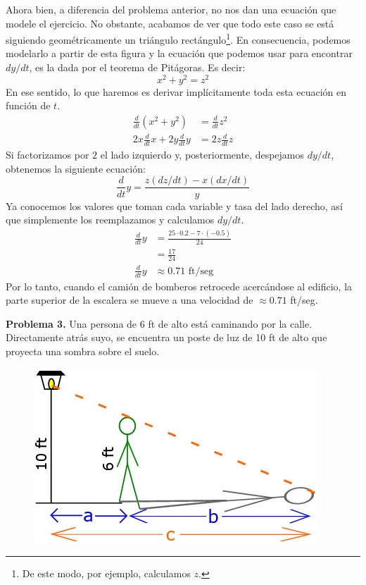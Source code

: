 \documentclass[12pt]{article}
\begin{document}
Ahora bien, a diferencia del problema anterior, no nos dan una ecuación que modele el ejercicio. No obstante, acabamos de ver que todo este caso se está siguiendo geométricamente un triángulo rectángulo\footnote{De este modo, por ejemplo, calculamos $z$.}. En consecuencia, podemos modelarlo a partir de esta figura y la ecuación que podemos usar para encontrar $dy/dt$, es la dada por el teorema de Pitágoras. Es decir:
\[
	x^{2} + y^{2} = z^{2}
\]
En ese sentido, lo que haremos es derivar implícitamente toda esta ecuación en función de $t$.
\begin{align*}
	\frac{d}{dt} (x^{2} + y^{2}) &= \frac{d}{dt}z^{2} \\
	2x\frac{d}{dt}x + 2y\frac{d}{dt}y &= 2z \frac{d}{dt}z	
\end{align*}
Si factorizamos por $2$ el lado izquierdo y, posteriormente, despejamos $dy/dt$, obtenemos la siguiente ecuación:
\[
 \frac{d}{dt}y = \frac{z(dz/dt) - x(dx/dt)}{y}
\]
Ya conocemos los valores que toman cada variable y tasa del lado derecho, así que simplemente los reemplazamos y calculamos $dy/dt$.
\begin{align*}
	\frac{d}{dt}y &= \frac{25 \cdot 0.2 - 7 \cdot(-0.5)}{24} \\
	              &= \frac{17}{24} \\
	\frac{d}{dt}y &\approx 0.71 \text{ ft/seg}
\end{align*}
Por lo tanto, cuando el camión de bomberos retrocede acercándose al edificio, la parte superior de la escalera se mueve a una velocidad de $\approx 0.71$ ft/seg.


\textbf{Problema 3.} \quad Una persona de 6 ft de alto está caminando por la calle. Directamente atrás suyo, se encuentra un poste de luz de 10 ft de alto que proyecta una sombra sobre el suelo.

\begin{figure}[hbt!]
\centering
\includegraphics[scale=0.6]{img/related-prob-3.jpg}
\end{figure}
\end{document}
